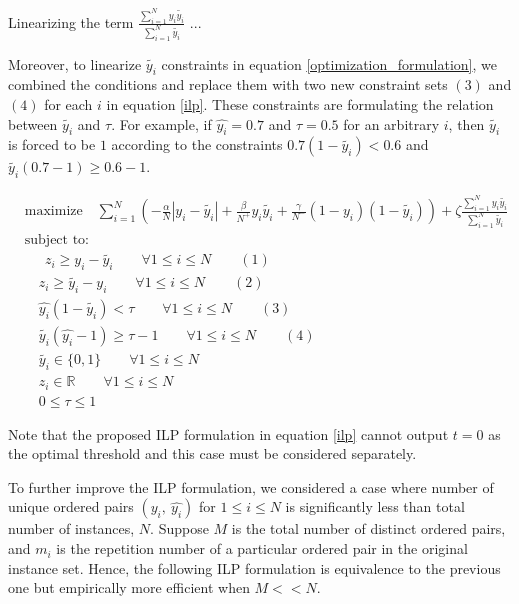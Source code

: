\documentclass[a4paper]{article}
\begin{document}
Linearizing the term $\frac{\sum_{i=1}^{N} y_i \tilde{y_i}}{\sum_{i=1}^{N} \tilde{y_i}}$ ...

 Moreover, to linearize $\tilde{y_i}$ constraints in equation \ref{optimization_formulation}, we combined the conditions and replace them with two new constraint sets $(3)$ and $(4)$ for each $i$ in equation \ref{ilp}. These constraints are formulating the relation between $\tilde{y_i}$ and $\tau$. For example, if $\hat{y_i} = 0.7$ and $\tau=0.5$ for an arbitrary $i$, then $\tilde{y_i}$ is forced to be $1$ according to the constraints $0.7 (1 - \tilde{y_i}) < 0.6$ and $\tilde{y_i} (0.7 - 1) \ge 0.6 - 1$.

\begin{equation}
\label{ilp}
\begin{aligned}
&\text{maximize} \quad \sum_{i=1}^{N} \left(-\frac{\alpha}{N}|y_i -\tilde{y_i}| + \frac{\beta}{N^+} y_i \tilde{y_i} + \frac{\gamma}{N^-} (1-y_i) (1-\tilde{y_i})\right) + \zeta \frac{\sum_{i=1}^{N} y_i \tilde{y_i}}{\sum_{i=1}^{N} \tilde{y_i}}\\
&\text{subject to:}\\
&\quad \: \: z_i \ge y_i - \tilde{y_i} \qquad \forall 1\le i \le N \qquad (1)\\
& \quad z_i \ge \tilde{y_i}  - y_i \qquad \forall 1\le i \le N \qquad (2)\\
& \quad \hat{y_i} (1 - \tilde{y_i}) < \tau \qquad \forall 1\le i \le N \qquad (3)\\
& \quad  \tilde{y_i} (\hat{y_i} - 1) \ge \tau - 1 \qquad \forall 1\le i \le N \qquad (4)\\
& \quad \tilde{y_i} \in \{0, 1\} \qquad \forall 1\le i \le N \\
& \quad z_i \in \mathbb{R} \qquad \forall 1\le i \le N \\
& \quad  0 \le \tau \le 1
\end{aligned}
\end{equation}

Note that the proposed ILP formulation in equation \ref{ilp} cannot output $t=0$ as the optimal threshold and this case must be considered separately. 

To further improve the ILP formulation, we considered a case where number of unique ordered pairs $(y_i,\: \hat{y_i})$ for $1 \le i \le N$ is significantly less than total number of instances, $N$. Suppose $M$ is the total number of distinct ordered pairs, and $m_i$ is the repetition number of a particular ordered pair in the original instance set. Hence, the following ILP formulation is equivalence to the previous one but empirically more efficient when $M << N$.
\end{document}
